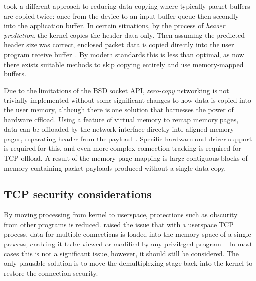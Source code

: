 \documentclass[11pt,a4paper,british]{bhamarticle}
\begin{document}
\begin{multicols}{2}
\citeauthor{braun:inria-00074040} took a different approach to reducing data copying where typically packet buffers are copied twice: once from the device to an input buffer queue then secondly into the application buffer. In certain situations, by the process of \textit{header prediction}, the kernel copies the header data only. Then assuming the predicted header size was correct, enclosed packet data is copied directly into the user program receive buffer~\cite[4.1]{braun:inria-00074040}. By modern standards this is less than optimal, as now there exists suitable methods to skip copying entirely and use memory-mapped buffers.

Due to the limitations of the BSD socket API, \textit{zero-copy} networking is not trivially implemented without some significant changes to how data is copied into the user memory, although there is one solution that harnesses the power of hardware offload. Using a feature of virtual memory to remap memory pages, data can be offloaded by the network interface directly into aligned memory pages, separating header from the payload~\cite[2.3]{chase2001end}. Specific hardware and driver support is required for this, and even more complex connection tracking is required for TCP offload. A result of the memory page mapping is large contiguous blocks of memory containing packet payloads produced without a single data copy.

\subsection{TCP security considerations}
By moving processing from kernel to userspace, protections such as obscurity from other programs is reduced. \citeauthor{braun:inria-00074040} raised the issue that with a userspace TCP process, data for multiple connections is loaded into the memory space of a single process, enabling it to be viewed or modified by any privileged program~\cite[1, 2.1]{braun:inria-00074040}. In most cases this is not a significant issue, however, it should still be considered. The only plausible solution is to move the demultiplexing stage back into the kernel to restore the connection security.



\end{multicols}
\end{document}
